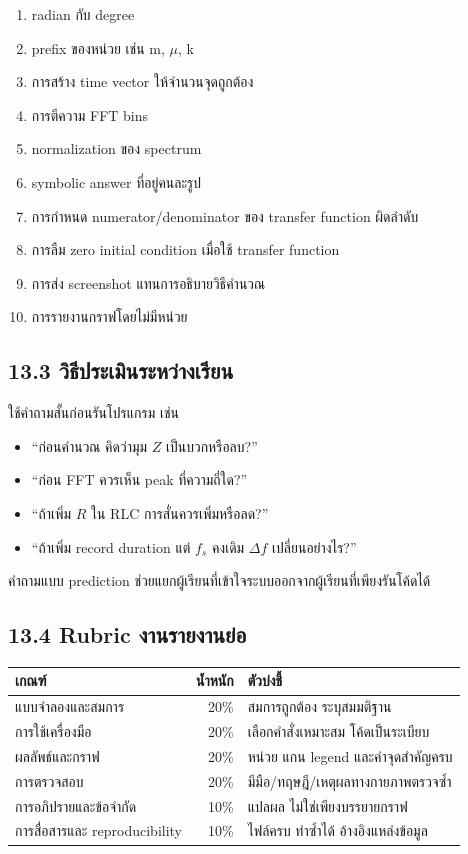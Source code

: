 \begin{enumerate}
    \item radian กับ degree
    \item prefix ของหน่วย เช่น m, $\mu$, k
    \item การสร้าง time vector ให้จำนวนจุดถูกต้อง
    \item การตีความ FFT bins
    \item normalization ของ spectrum
    \item symbolic answer ที่อยู่คนละรูป
    \item การกำหนด numerator/denominator ของ transfer function ผิดลำดับ
    \item การลืม zero initial condition เมื่อใช้ transfer function
    \item การส่ง screenshot แทนการอธิบายวิธีคำนวณ
    \item การรายงานกราฟโดยไม่มีหน่วย
\end{enumerate}

\subsection{13.3 วิธีประเมินระหว่างเรียน}

ใช้คำถามสั้นก่อนรันโปรแกรม เช่น

\begin{itemize}
    \item “ก่อนคำนวณ คิดว่ามุม $Z$ เป็นบวกหรือลบ?”
    \item “ก่อน FFT ควรเห็น peak ที่ความถี่ใด?”
    \item “ถ้าเพิ่ม $R$ ใน RLC การสั่นควรเพิ่มหรือลด?”
    \item “ถ้าเพิ่ม record duration แต่ $f_s$ คงเดิม $\Delta f$ เปลี่ยนอย่างไร?”
\end{itemize}

คำถามแบบ prediction ช่วยแยกผู้เรียนที่เข้าใจระบบออกจากผู้เรียนที่เพียงรันโค้ดได้

\subsection{13.4 Rubric งานรายงานย่อ}

\begin{table}[htbp]
    \centering
    \begin{tabular}{l r l}
        \hline
        \textbf{เกณฑ์} & \textbf{น้ำหนัก} & \textbf{ตัวบ่งชี้} \\
        \hline
        แบบจำลองและสมการ & 20\% & สมการถูกต้อง ระบุสมมติฐาน \\
        การใช้เครื่องมือ & 20\% & เลือกคำสั่งเหมาะสม โค้ดเป็นระเบียบ \\
        ผลลัพธ์และกราฟ & 20\% & หน่วย แกน legend และค่าจุดสำคัญครบ \\
        การตรวจสอบ & 20\% & มีมือ/ทฤษฎี/เหตุผลทางกายภาพตรวจซ้ำ \\
        การอภิปรายและข้อจำกัด & 10\% & แปลผล ไม่ใช่เพียงบรรยายกราฟ \\
        การสื่อสารและ reproducibility & 10\% & ไฟล์ครบ ทำซ้ำได้ อ้างอิงแหล่งข้อมูล \\
        \hline
    \end{tabular}
\end{table}

